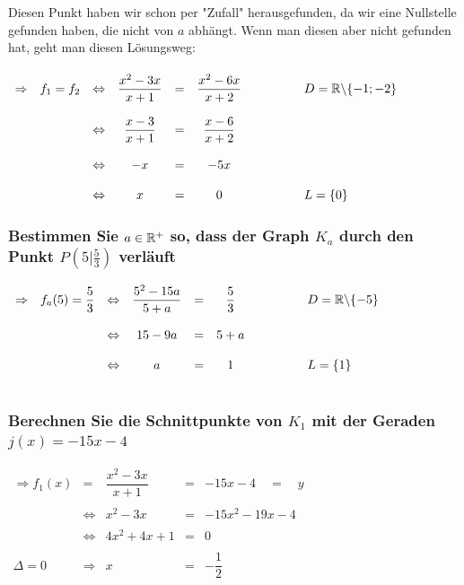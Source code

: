 \documentclass[main.tex]{subfiles}
\begin{document}
Diesen Punkt haben wir schon per "Zufall" herausgefunden, da wir eine Nullstelle gefunden haben, die nicht von $a$ abhängt. Wenn man diesen aber nicht gefunden hat, geht man diesen Lösungsweg:\\\\

$\begin{array}{rcccccl}
	\Rightarrow & f_{1}=f_{2} & \Leftrightarrow & \dfrac{x^2-3x}{x+1} & = & \dfrac{x^2-6x}{x+2} & \qquad \qquad D=\mathbb{R} \backslash \{-1;-2\} \\ \\
	&&\Leftrightarrow& \dfrac{x-3}{x+1} &=& \dfrac{x-6}{x+2}&  \\\\
	&&\Leftrightarrow& -x & = & -5x &\\ \\
	&&\Leftrightarrow& x &=& 0 & \qquad \qquad L=\{ 0 \} \\
\end{array}$

\subsubsection{Bestimmen Sie $a\in \mathbb{R}^+$ so, dass der Graph $K_{a}$ durch den Punkt $P(5|\frac{5}{3})$ verläuft}

$\begin{array}{rcccccl}
	\Rightarrow & f_{a}(5) = \dfrac{5}{3} & \Leftrightarrow & \dfrac{5^2-15a}{5+a} &=& \dfrac{5}{3} & \qquad \qquad D=\mathbb{R} \backslash \{-5\} \\\\
	&&\Leftrightarrow & 15-9a &=& 5+a &\\\\
	&&\Leftrightarrow & a&=&1&\qquad \qquad L=\{1\}\\\\
\end{array}$

\subsubsection{ Berechnen Sie die Schnittpunkte von $K_{1}$ mit der Geraden $j(x) =-15x -4$ }

$\begin{array}{rcccl}
	\Rightarrow  f_{1}(x) & = & \dfrac{x^2-3x}{x+1} &=& -15x-4 \quad = \quad y\\\\
	&\Leftrightarrow & x^2-3x &=& -15x^2-19x-4\\\\
	&\Leftrightarrow & 4x^2+4x+1 &=& 0\\\\
	\Delta = 0 & \Rightarrow &x &=& -\dfrac{1}{2}
\end{array}$
\end{document}
